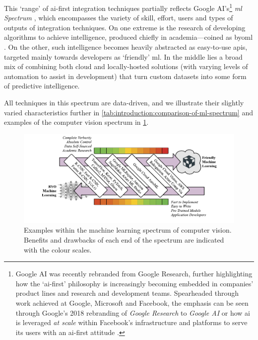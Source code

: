 


This `range' of \gls{ai}-first integration techniques partially reflects Google AI's\footnote{
Google AI was recently rebranded from Google Research, further highlighting how the `\gls{ai}-first' philosophy is increasingly becoming embedded in companies' product lines and research and development teams. Spearheaded through work achieved at Google, Microsoft and Facebook, the emphasis can be seen through Google's 2018 rebranding of \textit{Google Research} to \textit{Google AI}  or how \gls{ai} is leveraged \textit{at scale} within Facebook's infrastructure and platforms to serve its users with an \gls{ai}-first attitude \citep{Parekh:2017hx}.
} 
\textit{\acrlong{ml} Spectrum} \citep{Ortiz:2017wg,LaForge:2018tm,McGowen:2019vt}, which encompasses the variety of skill, effort, users and types of outputs of integration techniques. On one extreme is the research of developing algorithms to achieve intelligence, produced chiefly in academia---coined as \gls{byoml} \citep{Ortiz:2017wg,McGowen:2019vt,Jimerson:2017vh}. On the other, such intelligence becomes heavily abstracted as easy-to-use \glspl{api}, targeted mainly towards developers as `friendly' \gls{ml}. In the middle lies a broad mix of combining both cloud and locally-hosted solutions (with varying levels of automation to assist in development) that turn custom datasets into some form of predictive intelligence. 

All techniques in this spectrum are data-driven, and we illustrate their slightly varied characteristics further in \cref{tab:introduction:comparison-of-ml-spectrum} and examples of the computer vision spectrum in \cref{fig:introduction:cv-spectrum}.

\begin{figure}[h!]
\centering
\caption[The spectrum of machine learning]{Examples within the machine learning spectrum of computer vision. Benefits and drawbacks of each end of the spectrum are indicated with the colour scales.}
\label{fig:introduction:cv-spectrum}
\includegraphics[width=\linewidth]{cv-spectrum}
\end{figure}

